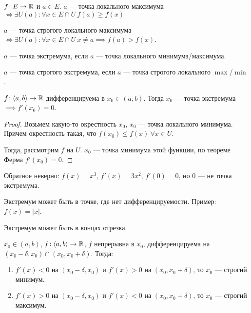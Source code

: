 \begin{definition}
    $f\!: E \to \mathbb{R}$ и  $a \in E$. $a$ --- точка локального максимума $\iff \exists U(a)\!: \forall x \in E \cap U\ f(a)\ge f(x)$ 
\end{definition}
\begin{definition}
    $a$ --- точка строгого локального максимума  $\iff \exists U(a)\!: \forall x \in E \cap U\ x \neq a \implies f(a) > f(x)$.
\end{definition}
\begin{definition}
    $a$ --- точка экстремума, если  $a$ --- точка локального минимума/максимума.
\end{definition}
\begin{definition}
    $a$ --- точка строгого экстремума, если  $a$ --- точка строгого локального  $\max$/$\min$.
\end{definition}
\begin{theorem}
    $f\!:\langle a, b \rangle \to \mathbb{R}$ дифференцируема в  $x_0 \in (a, b)$. Тогда  $x_0$ --- точка экстремума  $\implies f'(x_0) = 0$.
\end{theorem}
\begin{proof}
    Возьмем какую-то окрестность $x_0$, $x_0$ --- точка локального минимума. Причем окрестность такая, что $f(x_0) \le f(x)\ \forall x \in U$. 

    Тогда, рассмотрим $f$ на  $U$.  $x_0$ --- точка минимума этой функции, по теореме Ферма  $f'(x_0) = 0$.
\end{proof}
\begin{remark}
    Обратное неверно: $f(x) = x^3$,  $f'(x) = 3x^2$,  $f'(0) = 0$, но  $0$ --- не точка экстремума.
\end{remark}
\begin{remark}
    Экстремум может быть в точке, где нет дифференцируемости. Пример: $f(x) = |x|$.
\end{remark}
\begin{remark}
    Экстремум может быть в концах отрезка. 
\end{remark}
\begin{theorem}
    $x_0 \in (a, b)$,  $f\!:\langle a, b \rangle \to \mathbb{R}$,  $f$ непрерывна в  $x_0$, дифференцируема на  $(x_0 - \delta, x_0) \cap (x_0, x_0 + \delta)$. Тогда: 
    \begin{enumerate}
        \item $f'(x) < 0$ на  $(x_0-\delta, x_0)$ и $f'(x) > 0$ на  $(x_0, x_0+\delta)$, то $x_0$ --- строгий минимум.
        \item $f'(x) > 0$ на  $(x_0-\delta, x_0)$ и $f'(x) < 0$ на  $(x_0, x_0+\delta)$, то $x_0$ --- строгий максимум.
    \end{enumerate}
\end{theorem}
